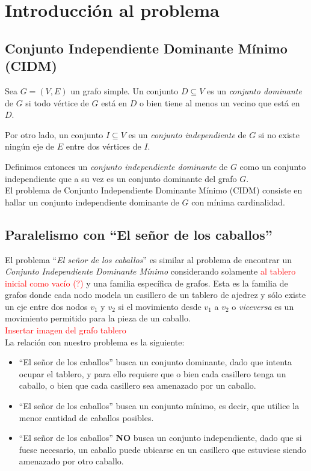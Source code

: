 \section{Introducci\'on al problema}
\subsection{Conjunto Independiente Dominante M\'inimo (CIDM)}

Sea $G = (V, E)$ un grafo simple. Un conjunto $D \subseteq V$ es un \emph{conjunto dominante} de $G$ si todo v\'ertice de $G$ est\'a en $D$ o bien tiene al menos un vecino que est\'a en $D$. 

Por otro lado, un conjunto $I \subseteq V$ es un \emph{conjunto independiente} de $G$ si no existe ning\'un eje de $E$ entre dos v\'ertices de $I$. 

Definimos entonces un \emph{conjunto independiente dominante} de $G$ como un conjunto independiente que a su vez es un conjunto dominante del grafo $G$.\\

El problema de Conjunto Independiente Dominante M\'inimo (CIDM) consiste en hallar un conjunto independiente dominante de $G$ con m\'inima cardinalidad.

\subsection{Paralelismo con ``El se\~nor de los caballos''}\label{caballitos}

El problema ``\emph{El se\~nor de los caballos}'' es similar al problema de encontrar un \emph{Conjunto Independiente Dominante M\'inimo} considerando solamente \textcolor{red}{al tablero inicial como vacío (?)} y una familia específica de grafos. Esta es la familia de grafos donde cada nodo modela un casillero de un tablero de ajedrez y sólo existe un eje entre dos nodos $v_1$ y $v_2$ si el movimiento desde $v_1$ a $v_2$ o \textit{viceversa} es un movimiento permitido para la pieza de un caballo.\\

\textcolor{red}{Insertar imagen del grafo tablero}\\

La relación con nuestro problema es la siguiente:
\begin{itemize}
	\item ``El se\~nor de los caballos'' busca un conjunto dominante, dado que intenta ocupar el tablero, y para ello requiere que o bien cada casillero tenga un caballo, o bien que cada casillero sea amenazado por un caballo.
	\item ``El se\~nor de los caballos'' busca un conjunto m\'inimo, es decir, que utilice la menor cantidad de caballos posibles.
	\item ``El se\~nor de los caballos'' \textbf{NO} busca un conjunto independiente, dado que si fuese necesario, un caballo puede ubicarse en un casillero que estuviese siendo amenazado por otro caballo.
	
\end{itemize}
\newpage
